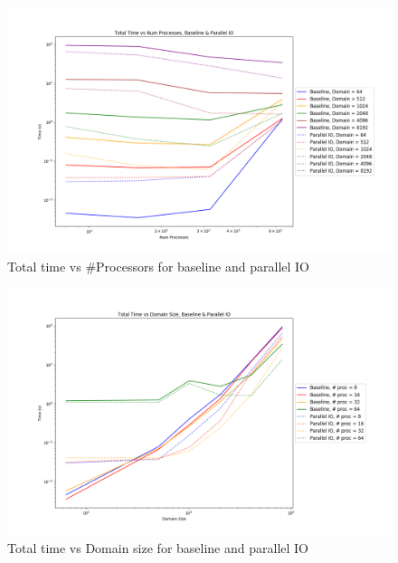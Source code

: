 \begin{enumerate}
 \begin{figure}[p] %
   \begin{center}
     \includegraphics[width=.9\linewidth]{Figures/io/total_multdomain_haswell_io_baseline.png} %
     \caption{Total time vs \#Processors for baseline and parallel IO}
     \label{fig:par_io_total_vs_proc}
   \end{center}
 \end{figure}

 \begin{figure}[p] %
  \begin{center}
    \includegraphics[width=.9\linewidth]{Figures/io/total_multproc_haswell_io_baseline.png} %
    \caption{Total time vs Domain size for baseline and parallel IO}
    \label{fig:par_io_total_vs_domain}
  \end{center}
  \end{figure}
 

\end{enumerate}
